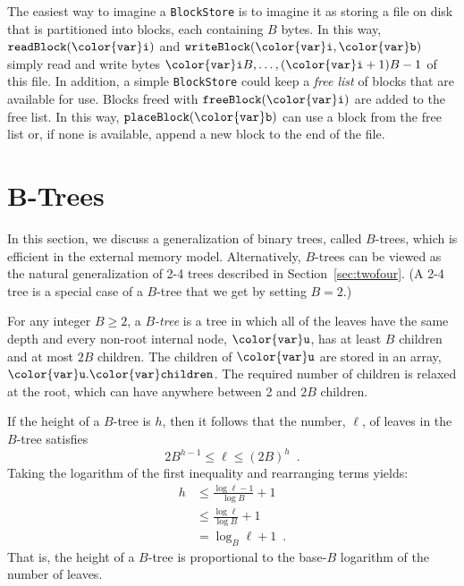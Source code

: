 \documentclass[10pt]{book}
\newcommand{\seclabel}[1]{\label{sec:#1}}
\newcommand{\secref}[1]{Section~\ref{sec:#1}}
\theoremstyle{plain}
\theoremstyle{definition}
\begin{document}
The easiest way to imagine a \texttt{BlockStore} is to imagine it as storing a
file on disk that is partitioned into blocks, each containing $B$ bytes.
In this way, \ensuremath{\mathtt{readBlock({\color{var}i})}} and \ensuremath{\mathtt{writeBlock({\color{var}i},{\color{var}b})}} simply read and write
bytes $\ensuremath{\mathtt{{\color{var}i}}}B,\ldots,(\ensuremath{\mathtt{{\color{var}i}}}+1)B-1$ of this file.  In addition, a simple
\texttt{BlockStore} could keep a \emph{free list} of blocks that are available
for use. Blocks freed with \ensuremath{\mathtt{freeBlock({\color{var}i})}} are added to the free list.
In this way, \ensuremath{\mathtt{placeBlock({\color{var}b})}} can use a block from the free list or,
if none is available, append a new block to the end of the file.


\section{B-Trees}
\seclabel{btree}

In this section, we discuss a generalization of binary trees,
called $B$-trees, which is efficient in the external memory model.
Alternatively, $B$-trees can be viewed as the natural generalization of
2-4 trees described in \secref{twofour}. (A 2-4 tree is a special case
of a $B$-tree that we get by setting $B=2$.)

%
For any integer $B\ge 2$, a \emph{$B$-tree} is a tree in which all of
the leaves have the same depth and every non-root internal node, \ensuremath{\mathtt{{\color{var}u}}},
has at least $B$ children and at most $2B$ children.  The children of \ensuremath{\mathtt{{\color{var}u}}}
are stored in an array, \ensuremath{\mathtt{{\color{var}u}.{\color{var}children}}}.  The required number of children is
relaxed at the root, which can have anywhere between 2 and $2B$ children.

If the height of a $B$-tree is $h$, then it follows that the number,
$\ell$, of leaves in the $B$-tree satisfies
\[
    2B^{h-1} \le \ell \le (2B)^{h} \enspace .
\]
Taking the logarithm of the first inequality and rearranging terms yields:
\begin{align*}
    h & \le \frac{\log \ell-1}{\log B} + 1  \\
      & \le \frac{\log \ell}{\log B} + 1 \\
      & = \log_B \ell + 1 \enspace .
\end{align*}
That is, the height of a $B$-tree is proportional to the base-$B$
logarithm of the number of leaves.
\end{document}
